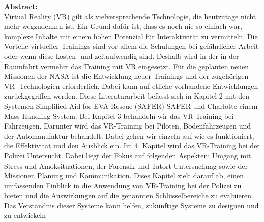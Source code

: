 {\small
\textbf{Abstract:}\\
Virtual Reality (VR) gilt als vielversprechende Technologie, die heutzutage nicht mehr
wegzudenken ist. Ein Grund dafür ist, dass es noch nie so einfach war, komplexe Inhalte mit
einem hohen Potenzial für Interaktivität zu vermitteln. Die Vorteile virtueller Trainings sind
vor allem die Schulungen bei gefährlicher Arbeit oder wenn diese kosten- und zeitaufwendig
sind. Deshalb wird in der in der Raumfahrt vermehrt das Training mit VR eingesetzt. Für die
geplanten neuen Missionen der NASA ist die Entwicklung neuer Trainings und der
zugehörigen VR- Technologien erforderlich. Dabei kann auf etliche vorhandene
Entwicklungen zurückgegriffen werden. Diese Literaturarbeit befasst sich in Kapitel 2 mit den Systemen
Simplified Aid for EVA Rescue (SAFER) SAFER und Charlotte einem Mass Handling
System.
Bei Kapitel 3 behandeln wir das VR-Training bei Fahrzeugen. Darunter wird das VR-Training bei Piloten, Bodenfahrzeugen und der Automanufaktur behandelt. Dabei gehen wir einzeln auf wie es funktioniert, die Effektivität und den Ausblick ein.
Im 4. Kapitel wird das VR-Training bei der Polizei Untersucht. Dabei liegt der Fokus auf folgenden Aspekten: Umgang mit Stress und Amoksituationen, der Forensik und Tatort-Untersuchung sowie der Missionen Planung und Kommunikation. Dises Kapitel zielt darauf ab, einen umfassenden Einblick in die Anwendung von VR-Training bei der Polizei zu bieten und die Auswirkungen auf
die genannten Schlüsselbereiche zu evaluieren.
Das Verständnis dieser Systeme kann helfen, zukünftige Systeme zu designen und
zu entwickeln
}